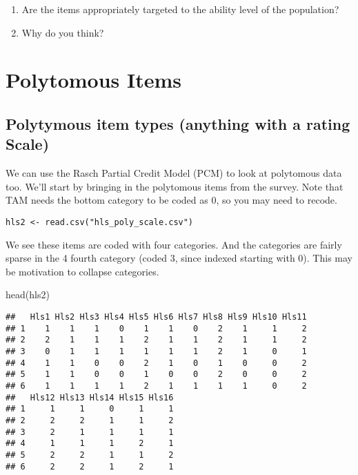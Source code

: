 \documentclass[
]{book}
\newenvironment{Shaded}{\begin{snugshade}}{\end{snugshade}}
\newcommand{\FunctionTok}[1]{\textcolor[rgb]{0.00,0.00,0.00}{#1}}
\newcommand{\NormalTok}[1]{#1}
\providecommand{\tightlist}{%
  \setlength{\itemsep}{0pt}\setlength{\parskip}{0pt}}
\begin{document}
\begin{enumerate}
\def\labelenumi{\arabic{enumi}.}
\tightlist
\item
  Are the items appropriately targeted to the ability level of the population?
\item
  Why do you think?
\end{enumerate}

\hypertarget{polytomous-items}{%
\chapter{Polytomous Items}\label{polytomous-items}}

\hypertarget{polytymous-item-types-anything-with-a-rating-scale}{%
\section{Polytymous item types (anything with a rating Scale)}\label{polytymous-item-types-anything-with-a-rating-scale}}

We can use the Rasch Partial Credit Model (PCM) to look at polytomous data too. We'll start by bringing in the polytomous items from the survey. Note that TAM needs the bottom category to be coded as 0, so you may need to recode.

\begin{verbatim}
hls2 <- read.csv("hls_poly_scale.csv")
\end{verbatim}

We see these items are coded with four categories. And the categories are fairly sparse in the 4 fourth category (coded 3, since indexed starting with 0). This may be motivation to collapse categories.

\begin{Shaded}
\begin{Highlighting}[]
\FunctionTok{head}\NormalTok{(hls2)}
\end{Highlighting}
\end{Shaded}

\begin{verbatim}
##   Hls1 Hls2 Hls3 Hls4 Hls5 Hls6 Hls7 Hls8 Hls9 Hls10 Hls11
## 1    1    1    1    0    1    1    0    2    1     1     2
## 2    2    1    1    1    2    1    1    2    1     1     2
## 3    0    1    1    1    1    1    1    2    1     0     1
## 4    1    1    0    0    2    1    0    1    0     0     2
## 5    1    1    0    0    1    0    0    2    0     0     2
## 6    1    1    1    1    2    1    1    1    1     0     2
##   Hls12 Hls13 Hls14 Hls15 Hls16
## 1     1     1     0     1     1
## 2     2     2     1     1     2
## 3     2     1     1     1     1
## 4     1     1     1     2     1
## 5     2     2     1     1     2
## 6     2     2     1     2     1
\end{verbatim}
\end{document}
